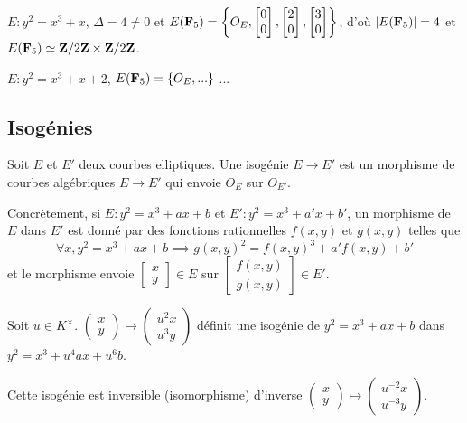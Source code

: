 	\begin{ex}
		$E : y^2 = x^3 + x$, $\Delta = 4 \neq 0$ et $E(\mathbf{F}_5) = \left\{ O_E, \begin{bmatrix} 0 \\ 0 \end{bmatrix}, \begin{bmatrix} 2 \\ 0 \end{bmatrix}, \begin{bmatrix} 3 \\ 0 \end{bmatrix} \right\}$, d'où $\left\lvert E(\mathbf{F}_5)\right\rvert = 4$ et $E(\mathbf{F}_5) \simeq \mathbf{Z} / 2\mathbf{Z} \times \mathbf{Z} / 2\mathbf{Z}$.
	\end{ex}
	
	\begin{ex}
		$E : y^2 = x^3 + x + 2$, $E(\mathbf{F}_5) = \left\{ O_E, ... \right\}$
		...%
	\end{ex}


\subsection{Isogénies}

	\begin{defn}
		Soit $E$ et $E'$ deux courbes elliptiques.
		Une isogénie $E \to E'$ est un morphisme de courbes algébriques $E \to E'$ qui envoie $O_E$ sur $O_{E'}$.
	\end{defn}
	
	Concrètement, si $E : y^2 = x^3 + ax + b$ et $E' : y^2 = x^3 + a' x + b'$, un morphisme de $E$ dans $E'$ est donné par des fonctions rationnelles $f(x,y)$ et $g(x,y)$ telles que
	$$\forall x, y^2 = x^3 + ax + b \implies g(x,y)^2 = f(x,y)^3 + a'  f(x,y) + b'$$
	et le morphisme envoie $\begin{bmatrix} x \\ y \end{bmatrix} \in E$ sur $\begin{bmatrix} f(x,y) \\ g(x,y) \end{bmatrix} \in E'$.
	
	\begin{ex}
		Soit $u \in K^\times$.
		$\begin{pmatrix} x \\ y \end{pmatrix} \mapsto \begin{pmatrix} u^2 x \\ u^3 y \end{pmatrix}$ définit une isogénie de $y^2 = x^3 + ax + b$ dans $y^2 = x^3 + u^4 ax + u^6 b$.
		
		Cette isogénie est inversible (isomorphisme) d'inverse $\begin{pmatrix} x \\ y \end{pmatrix} \mapsto \begin{pmatrix} u^{-2} x \\ u^{-3} y \end{pmatrix}$.
	\end{ex}
	
